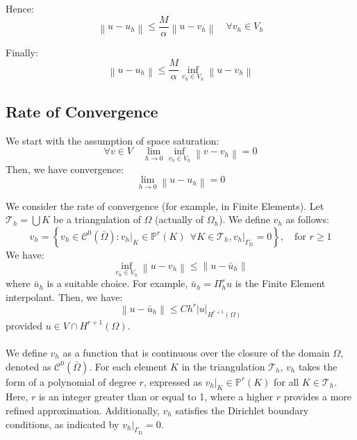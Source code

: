 \documentclass[11pt]{book}
\begin{document}
Hence:
\begin{equation*}
\left\|u-u_{h}\right\| \leq \frac{M}{\alpha}\left\|u-v_{h}\right\| \quad \forall v_{h} \in V_{h}
\end{equation*}

Finally:
\begin{equation*}
\left\|u-u_{h}\right\| \leq \frac{M}{\alpha} \inf _{v_{h} \in V_{h}}\left\|u-v_{h}\right\|
\end{equation*}

\subsection*{Rate of Convergence}
We start with the assumption of space saturation:
\begin{equation*}
\forall v \in V \quad \lim _{h \rightarrow 0} \inf _{v_{h} \in V_{h}}\left\|v-v_{h}\right\|=0
\end{equation*}
Then, we have convergence:
\begin{equation*}
\lim _{h \rightarrow 0}\left\|u-u_{h}\right\|=0
\end{equation*}

We consider the rate of convergence (for example, in Finite Elements). Let $\mathcal{T}_{h}=\bigcup K$ be a triangulation of $\Omega$ (actually of $\Omega_{h}$). We define $v_{h}$ as follows:
\begin{equation*}
v_{h}=\left\{v_{h} \in \mathcal{C}^{0}(\bar{\Omega}):\left.v_{h}\right|_{K} \in \mathbb{P}^{r}(K) \ \ \forall K \in \mathcal{T}_{h},\left.v_{h}\right|_{\Gamma_{\mathrm{D}}}=0\right\}, \quad \text{for } r \geq 1
\end{equation*}
We have:
\begin{equation*}
\inf _{v_{h} \in V_{h}}\left\|u-v_{h}\right\| \leq\left\|u-\bar{u}_{h}\right\|
\end{equation*}
where $\bar{u}_{h}$ is a suitable choice. For example, $\bar{u}_{h}=\Pi_{h}^{r} u$ is the Finite Element interpolant. Then, we have:
\begin{equation*}
\left\|u-\bar{u}_{h}\right\| \leq C h^{r}|u|_{H^{r+1}(\Omega)}
\end{equation*}
provided $u \in V \cap H^{r+1}(\Omega)$. \\ \\ 
We define \( v_h \) as a function that is continuous over the closure of the domain \( \Omega \), denoted as \( \mathcal{C}^{0}(\bar{\Omega}) \). For each element \( K \) in the triangulation \( \mathcal{T}_h \), \( v_h \) takes the form of a polynomial of degree \( r \), expressed as \( v_h|_{K} \in \mathbb{P}^{r}(K) \) for all \( K \in \mathcal{T}_h \). Here, \( r \) is an integer greater than or equal to 1, where a higher \( r \) provides a more refined approximation. Additionally, \( v_h \) satisfies the Dirichlet boundary conditions, as indicated by \( v_h|_{\Gamma_{\mathrm{D}}} = 0 \).
\end{document}
